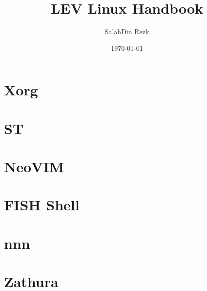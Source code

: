 \documentclass{article}
\title{LEV Linux Handbook}
\author{SalahDin Rezk}
\date{\today}
\begin{document}
\maketitle
\tableofcontents

\section{Xorg}


\section{ST}
\section{NeoVIM}
\section{FISH Shell}
\section{nnn}
\section{Zathura}
\end{document}
